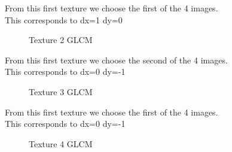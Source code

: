 \documentclass{article}
\begin{document}
	From this first texture we choose the first of the 4 images.\\
	This corresponds to dx=1 dy=0  


	\begin{figure}[h!]%
		\centering
    	\caption{Texture 2 GLCM}%
    	\label{fig:o1_f2}%
	\end{figure}

	From this first texture we choose the second of the 4 images.\\
	This corresponds to dx=0 dy=-1  
\newpage
	\begin{figure}[h!]%
		\centering
    	\caption{Texture 3 GLCM}%
    	\label{fig:o1_f3}%
	\end{figure}

	From this first texture we choose the first  of the 4 images.\\
	This corresponds to dx=0 dy=-1  

	\begin{figure}[h!]%
		\centering
    	\caption{Texture 4 GLCM}%
    	\label{fig:o1_f4}%
	\end{figure}
\end{document}
